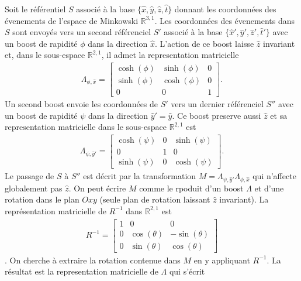 Soit le référentiel $S$ associé à la base $\{\hat{x}, \hat{y}, \hat{z}, \hat{t}\}$ donnant les coordonnées des évenements de l'espace de Minkowski $\mathbb{R}^{3, 1}$. Les coordonnées des évenements dans $S$ sont envoyés vers un second référenciel $S'$ associé à la base $\{\hat{x}', \hat{y}', \hat{z}', \hat{t}'\}$ avec un boost de rapidité $\phi$ dans la direction $\hat{x}$. L'action de ce boost laisse $\hat{z}$ invariant et, dans le sous-espace $\mathbb{R}^{2, 1}$, il admet la representation matricielle
\begin{align*}
    \Lambda_{\phi, \hat{x}} = \left[\begin{matrix}\cosh{\left(\phi \right)} & \sinh{\left(\phi \right)} & 0\\\sinh{\left(\phi \right)} & \cosh{\left(\phi \right)} & 0\\0 & 0 & 1\end{matrix}\right].
\end{align*}  
Un second boost envoie les coordonnées de $S'$ vers un dernier référenciel $S''$ avec un boost de rapidité $\psi$ dans la direction $\hat{y}' = \hat{y}$. Ce boost preserve aussi $\hat{z}$ et sa representation matricielle dans le sous-espace $\mathbb{R}^{2, 1}$ est 
\begin{align*}
    \Lambda_{\psi, \hat{y}'} = \left[\begin{matrix}\cosh{\left(\psi \right)} & 0 & \sinh{\left(\psi \right)}\\0 & 1 & 0\\\sinh{\left(\psi \right)} & 0 & \cosh{\left(\psi \right)}\end{matrix}\right].  
\end{align*}
Le passage de $S$ à $S''$ est décrit par la transformation $M = \Lambda_{\psi, \hat{y}'}\Lambda_{\phi, \hat{x}}$ qui n'affecte globalement pas $\hat{z}$. On peut écrire $M$ comme le rpoduit d'un boost $\Lambda$ et d'une rotation dans le plan $Oxy$ (seule plan de rotation laissant $\hat{z}$ invariant). La représentation matricielle de $R^{-1}$ dans $\mathbb{R}^{2, 1}$ est 
\begin{align*}
    R^{-1} = \left[\begin{matrix}1 & 0 & 0\\0 & \cos{\left(\theta \right)} & - \sin{\left(\theta \right)}\\0 & \sin{\left(\theta \right)} & \cos{\left(\theta \right)}\end{matrix}\right]
\end{align*}.
On cherche à extraire la rotation contenue dans $M$ en y appliquant $R^{-1}$. La résultat est la representation matricielle de $\Lambda$ qui s'écrit 
